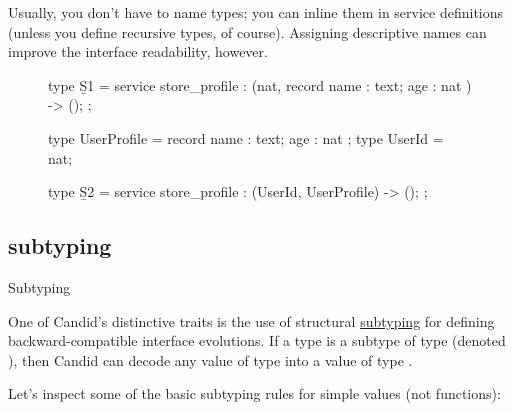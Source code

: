 \documentclass{article}
\begin{document}
Usually, you don't have to name types; you can inline them in service definitions (unless you define recursive types, of course).
Assigning descriptive names can improve the interface readability, however.

\begin{figure}

\begin{code}[candid]
type \b{S1} = service {
  store_profile : (nat, record { name : text; age : nat }) -> ();
};

type UserProfile = record { name : text; age : nat };
type UserId = nat;

type \b{S2} = service {
  store_profile : (UserId, UserProfile) -> ();
};
\end{code}
\end{figure}

\subsection{subtyping}{Subtyping}

One of Candid's distinctive traits is the use of structural \href{https://en.wikipedia.org/wiki/Subtyping}{subtyping} for defining backward-compatible interface evolutions.
If a type  is a subtype of type  (denoted ), then Candid can decode any value of type  into a value of type .

Let's inspect some of the basic subtyping rules for simple values (not functions):
\end{document}
